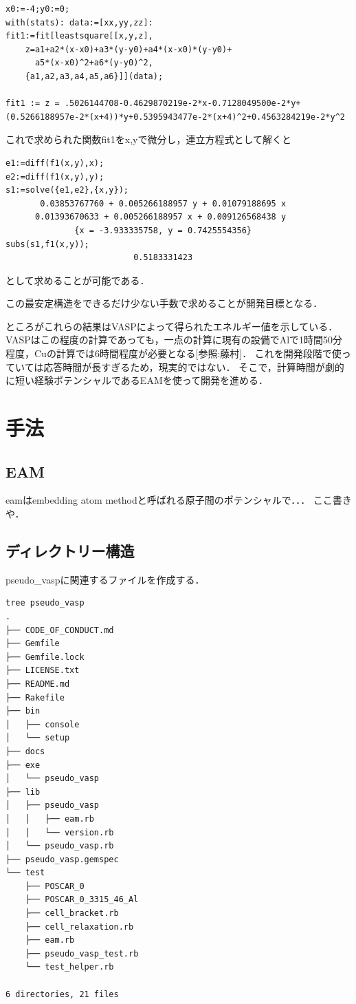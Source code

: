 \begin{verbatim}
x0:=-4;y0:=0;
with(stats): data:=[xx,yy,zz]: 
fit1:=fit[leastsquare[[x,y,z], 
    z=a1+a2*(x-x0)+a3*(y-y0)+a4*(x-x0)*(y-y0)+
      a5*(x-x0)^2+a6*(y-y0)^2, 
    {a1,a2,a3,a4,a5,a6}]](data);

fit1 := z = .5026144708-0.4629870219e-2*x-0.7128049500e-2*y+
(0.5266188957e-2*(x+4))*y+0.5395943477e-2*(x+4)^2+0.4563284219e-2*y^2
\end{verbatim}

これで求められた関数fit1をx,yで微分し，連立方程式として解くと

\begin{verbatim}
e1:=diff(f1(x,y),x);
e2:=diff(f1(x,y),y);
s1:=solve({e1,e2},{x,y});
       0.03853767760 + 0.005266188957 y + 0.01079188695 x
      0.01393670633 + 0.005266188957 x + 0.009126568438 y
              {x = -3.933335758, y = 0.7425554356}
subs(s1,f1(x,y));
                          0.5183331423
\end{verbatim}

として求めることが可能である．

この最安定構造をできるだけ少ない手数で求めることが開発目標となる．

ところがこれらの結果はVASPによって得られたエネルギー値を示している．
VASPはこの程度の計算であっても，一点の計算に現有の設備でAlで1時間50分程度，Cuの計算では6時間程度が必要となる{[}参照:藤村{]}．
これを開発段階で使っていては応答時間が長すぎるため，現実的ではない．
そこで，計算時間が劇的に短い経験ポテンシャルであるEAMを使って開発を進める．

    \section{手法}\label{ux624bux6cd5}

\subsection{EAM}\label{eam}

eamはembedding atom methodと呼ばれる原子間のポテンシャルで．．．
ここ書きや．

    \subsection{ディレクトリー構造}\label{ux30c7ux30a3ux30ecux30afux30c8ux30eaux30fcux69cbux9020}

pseudo\_vaspに関連するファイルを作成する．

\begin{verbatim}
tree pseudo_vasp
.
├── CODE_OF_CONDUCT.md
├── Gemfile
├── Gemfile.lock
├── LICENSE.txt
├── README.md
├── Rakefile
├── bin
│   ├── console
│   └── setup
├── docs
├── exe
│   └── pseudo_vasp
├── lib
│   ├── pseudo_vasp
│   │   ├── eam.rb
│   │   └── version.rb
│   └── pseudo_vasp.rb
├── pseudo_vasp.gemspec
└── test
    ├── POSCAR_0
    ├── POSCAR_0_3315_46_Al
    ├── cell_bracket.rb
    ├── cell_relaxation.rb
    ├── eam.rb
    ├── pseudo_vasp_test.rb
    └── test_helper.rb

6 directories, 21 files
\end{verbatim}

